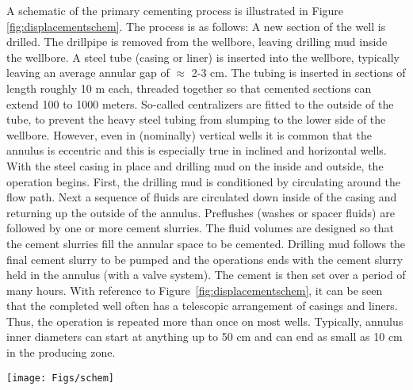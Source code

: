 \documentclass[review]{elsarticle}
\begin{document}
A schematic of the primary cementing process is illustrated in Figure \ref{fig:displacementschem}. The process is as follows: A new section of the well is drilled. The drillpipe is removed from the wellbore, leaving drilling mud inside the wellbore. A steel tube (casing or liner) is inserted into the wellbore, typically leaving an average annular gap of $\approx$ 2-3 cm. The tubing is inserted in sections of length roughly 10 m each, threaded together so that cemented sections can extend 100 to 1000 meters. So-called centralizers are fitted to the outside of the tube, to prevent the heavy steel tubing from slumping to the lower side of the wellbore. However, even in (nominally) vertical wells it is common that the annulus is eccentric and this is especially true in inclined and horizontal wells. With the steel casing in place and drilling mud on the inside and outside, the operation begins. First, the drilling mud is conditioned by circulating around the flow path. Next a sequence of fluids are circulated down inside of the casing and returning up the outside of the annulus. Preflushes (washes or spacer fluids) are followed by one or more cement slurries. The fluid volumes are designed so that the cement slurries fill the annular space to be cemented. Drilling mud follows the final cement slurry to be pumped and the operations ends with the cement slurry held in the annulus (with a valve system). The cement is then set over a period of many hours. With reference to Figure~\ref{fig:displacementschem}, it can be seen that the completed well often has a telescopic arrangement of casings and liners. Thus, the operation is repeated more than once on most wells. Typically, annulus inner diameters can start at anything up to 50 cm and can end as small as 10 cm in the producing zone. 

%
\begin{figure*}
		\begin{center}
			\texttt{[image: Figs/schem]}\\
			\caption{Schematic of the different stages of primary cementing}
			\label{fig:displacementschem}
		\end{center}
\end{figure*}
%
\end{document}
